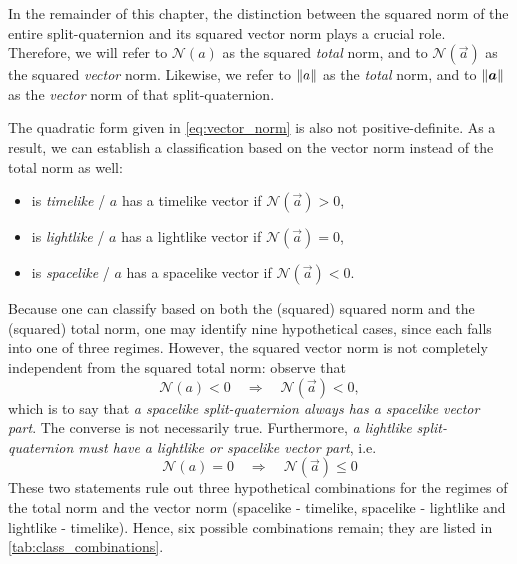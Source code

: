 In the remainder of this chapter, the distinction between the squared norm of the entire split-quaternion and its squared vector norm plays a crucial role. Therefore, we will refer to \(\mathscr{N}(a)\) as the squared \emph{total} norm, and to \(\mathscr{N}(\vec{a})\) as the squared \emph{vector} norm. Likewise, we refer to $\norm{a}$ as the \emph{total} norm, and to $\norm{\vec{a}}$ as the \emph{vector} norm of that split-quaternion.

The quadratic form given in \cref{eq:vector_norm} is also not positive-definite. As a result, we can establish a classification based on the vector norm instead of the total norm as well:
\begin{itemize}
    \item {} is \emph{timelike} / $a$ has a timelike vector if $\mathscr{N}(\vec{a}) > 0$,
    \item {} is \emph{lightlike} / $a$ has a lightlike vector if $\mathscr{N}(\vec{a}) = 0$,
    \item {} is \emph{spacelike} / $a$ has a spacelike vector if $\mathscr{N}(\vec{a}) < 0$.
\end{itemize}

Because one can classify based on both the (squared) squared norm and the (squared) total norm, one may identify nine hypothetical cases, since each falls into one of three regimes. However, the squared vector norm is not completely independent from the squared total norm: observe that 
\begin{equation}
    \mathscr{N}(a) < 0\quad \Rightarrow \quad \mathscr{N}(\vec{a}) < 0,
\end{equation} 
which is to say that \emph{a spacelike split-quaternion always has a spacelike vector part}. The converse is not necessarily true. Furthermore, \emph{a lightlike split-quaternion must have a lightlike or spacelike vector part}, i.e.
\begin{equation}
    \mathscr{N}(a) = 0 \quad \Rightarrow \quad \mathscr{N}(\vec{a}) \leq 0
\end{equation}
These two statements rule out three hypothetical combinations for the regimes of the total norm and the vector norm (spacelike - timelike, spacelike - lightlike and lightlike - timelike). Hence, six possible combinations remain; they are listed in \cref{tab:class_combinations}. 

